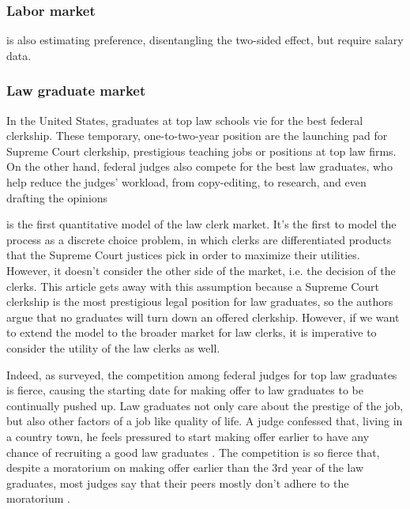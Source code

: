 \subsubsection{Labor market}

\citep{Abowd1999} is also estimating preference, disentangling the two-sided
effect, but require salary data.

\subsubsection{Law graduate market}

In the United States, graduates at top law schools vie for the best federal
clerkship. These temporary, one-to-two-year position are the launching pad for Supreme Court clerkship,
prestigious teaching jobs or positions at top law firms. On the other hand,
federal judges also compete for the best law graduates, who help reduce the
judges' workload, from copy-editing, to research, and even drafting the opinions
\citep[795]{Gulati2016, Posner2001}

\citep{Rozema2016} is the first quantitative model of the law clerk market. It's
the first to model the process as a discrete choice problem, in which clerks are
differentiated products that the Supreme Court justices pick in order to
maximize their utilities. However, it doesn't consider the other side of the
market, i.e. the decision of the clerks. This article gets away with this
assumption because a Supreme Court clerkship is the most prestigious legal
position for law graduates, so the authors argue that no graduates will turn
down an offered clerkship. However, if we want to extend the model to the
broader market for law clerks, it is imperative to consider the utility of the
law clerks as well.

Indeed, as \citep{Posner2001, Posner2007} surveyed, the competition among
federal judges for top law graduates is fierce, causing the starting date for
making offer to law graduates to be continually pushed up. Law graduates not
only care about the prestige of the job, but also other factors of a job like
quality of life. A judge confessed that, living in a country town, he feels
pressured to start making offer earlier to have any chance of recruiting a good
law graduates \citep{Posner2001}. The competition is so fierce that, despite a moratorium on making
offer earlier than the 3rd year of the law graduates, most judges say that their
peers mostly don't adhere to the moratorium \citep{Posner2007}.

